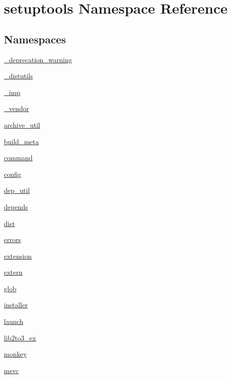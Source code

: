 \hypertarget{namespacesetuptools}{}\section{setuptools Namespace Reference}
\label{namespacesetuptools}
\subsection*{Namespaces}
\begin{DoxyCompactItemize}
\item 
 \hyperlink{namespacesetuptools_1_1__deprecation__warning}{\+\_\+deprecation\+\_\+warning}
\item 
 \hyperlink{namespacesetuptools_1_1__distutils}{\+\_\+distutils}
\item 
 \hyperlink{namespacesetuptools_1_1__imp}{\+\_\+imp}
\item 
 \hyperlink{namespacesetuptools_1_1__vendor}{\+\_\+vendor}
\item 
 \hyperlink{namespacesetuptools_1_1archive__util}{archive\+\_\+util}
\item 
 \hyperlink{namespacesetuptools_1_1build__meta}{build\+\_\+meta}
\item 
 \hyperlink{namespacesetuptools_1_1command}{command}
\item 
 \hyperlink{namespacesetuptools_1_1config}{config}
\item 
 \hyperlink{namespacesetuptools_1_1dep__util}{dep\+\_\+util}
\item 
 \hyperlink{namespacesetuptools_1_1depends}{depends}
\item 
 \hyperlink{namespacesetuptools_1_1dist}{dist}
\item 
 \hyperlink{namespacesetuptools_1_1errors}{errors}
\item 
 \hyperlink{namespacesetuptools_1_1extension}{extension}
\item 
 \hyperlink{namespacesetuptools_1_1extern}{extern}
\item 
 \hyperlink{namespacesetuptools_1_1glob}{glob}
\item 
 \hyperlink{namespacesetuptools_1_1installer}{installer}
\item 
 \hyperlink{namespacesetuptools_1_1launch}{launch}
\item 
 \hyperlink{namespacesetuptools_1_1lib2to3__ex}{lib2to3\+\_\+ex}
\item 
 \hyperlink{namespacesetuptools_1_1monkey}{monkey}
\item 
 \hyperlink{namespacesetuptools_1_1msvc}{msvc}

\end{DoxyCompactItemize}
